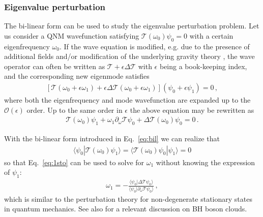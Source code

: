 \documentclass[aps,prd,amsmath,floats,floatfix, twocolumn,
superscriptaddress,nofootinbib,showpacs]{revtex4-1}
\begin{document}
\subsubsection{Eigenvalue perturbation}
\label{subsubsec:eigenvalue_perturbation}
The bi-linear form can be used to study the eigenvalue perturbation problem. Let us consider a QNM wavefunction satisfying $\mathcal{T}(\omega_0) \psi_0=0$ with a certain eigenfrequency $\omega_0$. If the wave equation is modified, e.g. due to the presence of additional fields \cite{Mark:2014aja} and/or modification of the underlying gravity theory \cite{Li:2022pcy,Hussain:2022ins,Wagle:2023fwl}, the wave operator can often be written as $\mathcal{T} +\epsilon\Delta \mathcal{T}$ with $\epsilon$ being a book-keeping index, and the corresponding new eigenmode satisfies
\begin{align}
\left [\mathcal{T}(\omega_0+\epsilon \omega_1)+\epsilon\Delta \mathcal{T}(\omega_0+\epsilon \omega_1) \right ] (\psi_0+\epsilon\psi_1)=0\,,
\end{align}
where both the eigenfrequency and mode wavefunction are expanded up to the $\mathcal{O}(\epsilon)$ order. Up to the same order in $\epsilon$ the above equation may be rewritten as
\begin{align}\label{eq:1sto}
\mathcal{T}(\omega_0) \psi_1+\omega_1 \partial_\omega \mathcal{T} \psi_0+\Delta \mathcal{T}(\omega_0) \psi_0=0\,.
\end{align}

With the bi-linear form introduced in Eq.~\eqref{eq:bil} we can realize that
\begin{align}
\langle \psi_0 | \mathcal{T}(\omega_0) \psi_1 \rangle =\langle \mathcal{T}(\omega_0) \psi_0 | \psi_1 \rangle =0
\end{align}
so that Eq.~\eqref{eq:1sto} can be used to solve for $\omega_1$ without knowing the expression of $\psi_1$:
\begin{align}
\omega_1 =-\frac{\langle \psi_0 | \Delta \mathcal{T} \psi_0 \rangle}{\langle \psi_0 | \partial_\omega \mathcal{T} \psi_0 \rangle}\,,
\end{align}
which is similar to the perturbation theory for non-degenerate stationary states in quantum mechanics. See also \cite{Cannizzaro:2023jle} for a relevant discussion on BH boson clouds.
\end{document}
